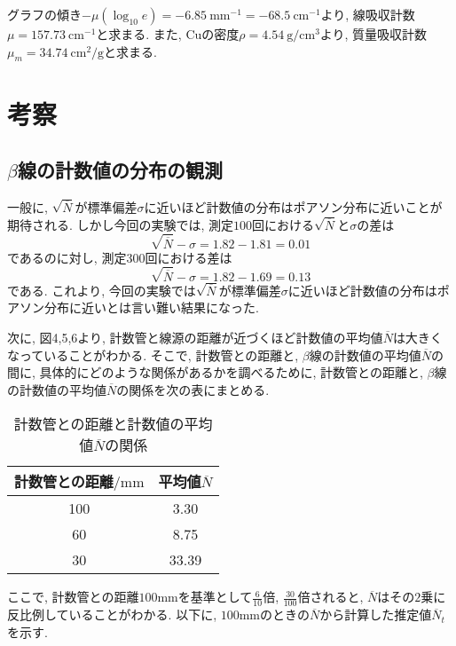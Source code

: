 \documentclass{jarticle}
\begin{document}
グラフの傾き$-\mu(\log_{10}e)=-6.85\ \mathrm{mm}^{-1}=-68.5\ \mathrm{cm}^{-1}$より, 線吸収計数$\mu=157.73\ \mathrm{cm}^{-1}$と求まる.
また, $\mathrm{Cu}$の密度$\rho=4.54\ \mathrm{g}/\mathrm{cm}^3$\cite{金属の密度}より, 質量吸収計数$\mu_m=34.74\ \mathrm{cm}^2/\mathrm{g}$と求まる.



\section{考察}


\subsection{$\beta$線の計数値の分布の観測}

一般に, $\sqrt{\overline{N}}$が標準偏差$\sigma$に近いほど計数値の分布はポアソン分布に近いことが期待される.
しかし今回の実験では, 測定$100$回における$\sqrt{\overline{N}}$と$\sigma$の差は
\begin{equation}
  \sqrt{\overline{N}} - \sigma = 1.82 - 1.81 = 0.01
\end{equation}
であるのに対し, 測定$300$回における差は
\begin{equation}
  \sqrt{\overline{N}} - \sigma = 1.82 - 1.69 = 0.13
\end{equation}
である.
これより, 今回の実験では$\sqrt{\overline{N}}$が標準偏差$\sigma$に近いほど計数値の分布はポアソン分布に近いとは言い難い結果になった.

次に, 図4,5,6より, 計数管と線源の距離が近づくほど計数値の平均値$\overline{N}$は大きくなっていることがわかる.
そこで, 計数管との距離と, $\beta$線の計数値の平均値$\overline{N}$の間に, 具体的にどのような関係があるかを調べるために, 計数管との距離と, $\beta$線の計数値の平均値$\overline{N}$の関係を次の表にまとめる.

\begin{table}[H]
  \centering
  \caption{計数管との距離と計数値の平均値$\overline{N}$の関係}
  \label{tb:N-and-distance}
  \begin{tabular}{cc}
    \hline
    計数管との距離$/\mathrm{mm}$ & 平均値$\overline{N}$ \\
    \hline
    100 & 3.30 \\
    60 & 8.75 \\
    30 & 33.39 \\
    \hline
  \end{tabular}
\end{table}

ここで, 計数管との距離$100\mathrm{mm}$を基準として$\frac{6}{10}$倍, $\frac{30}{100}$倍されると, $\overline{N}$はその$2$乗に反比例していることがわかる.
以下に, $100\mathrm{mm}$のときの$\overline{N}$から計算した推定値$\overline{N}_t$を示す.
\end{document}
